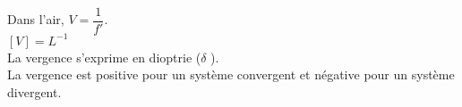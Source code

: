 ﻿\documentclass[a4paper]{article}
\begin{document}
\pagestyle{fancy}
\fancyhf{}
\setlength{\headheight}{15pt}

\begin{center}
	\large{}
\end{center}


\par
Dans l'air, \( V = \dfrac{1}{f'} \).\\
\( [V] = L^{ - 1} \)\\
La vergence s'exprime en dioptrie (\( \delta \) ).\\
La vergence est positive pour un système convergent et négative pour un système divergent.
\end{document}
